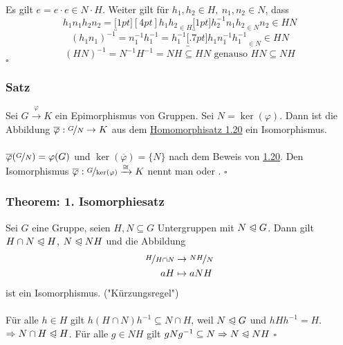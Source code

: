\\
Es gilt $e=e\cdot e\in N\cdot H$. 
Weiter gilt für $h_1,h_2 \in H,~n_1,n_2 \in N$, dass
\[
h_1n_1h_2n_2=\underbracket[1pt][4pt]{h_1h_2}_{\in H} \underbracket[1pt]{h_2^{-1}n_1h_2}_{\in N}n_2 \in HN 
\]
\[
(h_1n_1)^{-1}=n_1^{-1}h_1^{-1}=h_1^{-1}\underbracket[.7pt]{h_1n_1^{-1}h_1^{-1}}_{\in N} \in HN 
\]
\[
(HN)^{-1}=N^{-1}H^{-1}=NH \subseteq HN \text{ genauso } HN \subseteq NH 
\]
\hfill $\square$

\subsubsection*{Satz}
Sei $G\stackrel{\varphi}{\to}K$ ein Epimorphismus von Gruppen. Sei $N=\ker(\varphi)$. 
Dann ist die Abbildung $\overline{\varphi}:\nicefrac{G}{N}\to K$ aus dem \hyperref[sub:der_homomorphiesatz]{Homomorphisatz 1.20} ein Isomorphismus.\\

\\
$\overline{\varphi}(\nicefrac{G}{N})=\varphi(G)$ und $\ker(\overline{\varphi})=\{N\}$ nach dem Beweis von \hyperref[sub:der_homomorphiesatz]{1.20}.
Den Isomorphismus $\overline{\varphi}:\nicefrac{G}{\ker(\varphi)}  \xrightarrow{\cong} K$ nennt man  oder .
\hfill $\square$

\subsubsection*{Theorem: 1. Isomorphiesatz}
Sei $G$ eine Gruppe, seien $H,N\subseteq G$ Untergruppen mit $N\trianglelefteqslant G$. 
Dann gilt $H\cap N\trianglelefteqslant H$, $N \trianglelefteqslant NH$ und die Abbildung
\begin{equation*}
\begin{aligned}
	\nicefrac{H}{H\cap N} &\to \nicefrac{NH}{N}\\
	aH &\mapsto aNH
\end{aligned}
\end{equation*}
ist ein Isomorphismus. \qquad ("Kürzungsregel")\\

\\
Für alle $h\in H$ gilt $h(H\cap N)h^{-1}\subseteq N\cap H$, weil $N\trianglelefteqslant G$ und $hHh^{-1}=H$. 
$\Rightarrow N\cap H \trianglelefteqslant H$. 
Für alle $g\in NH$ gilt $gNg^{-1}\subseteq N \Rightarrow N\trianglelefteqslant NH$
\hfill $\square$

